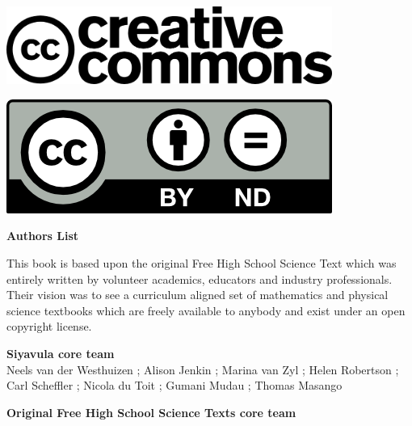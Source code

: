 \vspace*{4in}

\begin{center}
\begin{minipage}{0.6\textwidth}
\includegraphics[width=0.8\textwidth]{title_images/cc2.png}
\end{minipage}
\begin{minipage}{0.3\textwidth}
\includegraphics[width=0.8\textwidth]{title_images/cc1.png}
\end{minipage}
\end{center}







\newpage
\thispagestyle{empty}


\begin{flushleft} \textbf{\huge Authors List} \end{flushleft}

{\LARGE This book is based upon the original Free High School Science Text which was entirely written by
volunteer academics, educators and industry professionals. Their vision was to see a curriculum aligned
set of mathematics and physical science textbooks which are freely available to anybody and exist
under an open copyright license.} \par

\textbf{\LARGE Siyavula core team} \\

Neels van der Westhuizen ; Alison Jenkin ; Marina van Zyl ; Helen Robertson ; Carl Scheffler ; Nicola du Toit ; Gumani Mudau ; Thomas Masango \par

\textbf{\LARGE Original Free High School Science Texts core team}\\

